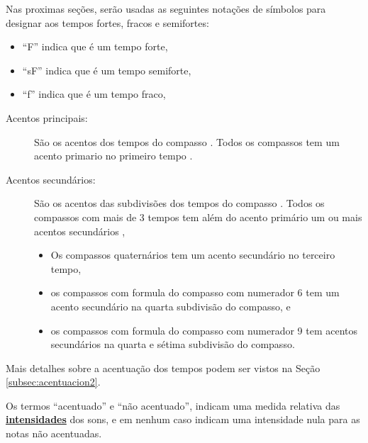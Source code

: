 \begin{notation}
Nas proximas seções,
serão usadas as seguintes notações de símbolos para designar aos tempos fortes, fracos e semifortes:
\begin{itemize}
\item ``F''  indica que é um tempo forte, 
\item ``sF'' indica que é um tempo semiforte, 
\item ``f''  indica que é um tempo fraco,
\end{itemize}
\end{notation}

\begin{description}
\item[Acentos principais:] \label{def:acentoprincipal} 
São os acentos dos tempos do compasso  \cite[pp. 142]{medteoria}.
Todos os compassos tem um acento primario no primeiro tempo \cite[pp. 24]{crowther2003usted}.
\item[Acentos secundários:] \label{def:acentosecundario} 
São os acentos das subdivisões dos tempos do compasso \cite[pp. 142]{medteoria}.
Todos os compassos com mais de 3 tempos tem além do acento primário um ou mais acentos secundários \cite[pp. 25]{crowther2003usted},
\begin{itemize}
\item Os compassos quaternários tem um acento secundário no terceiro tempo,
\item os compassos com formula do compasso com numerador 6  tem um acento secundário na quarta subdivisão do compasso, e
\item os compassos com formula do compasso com numerador 9  tem    acentos secundários na quarta e sétima subdivisão do compasso.
\end{itemize} 
\end{description}

Mais detalhes sobre a acentuação dos tempos podem ser vistos na Seção \ref{subsec:acentuacion2}.

\begin{tcbattention}
Os termos ``acentuado'' e ``não acentuado'', 
indicam uma medida relativa das \hyperref[sec:pos:Intensidade]{\textbf{intensidades}} dos sons, 
e em nenhum caso indicam uma intensidade nula para as notas não acentuadas. 
\end{tcbattention}


